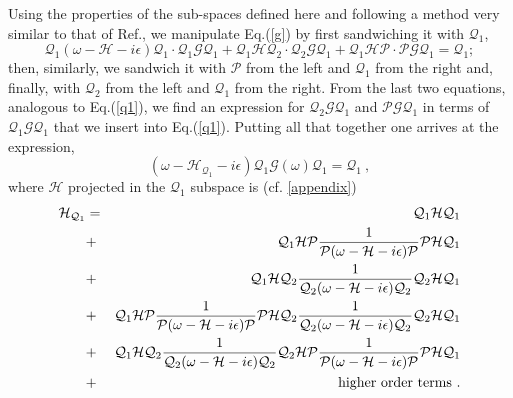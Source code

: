 \documentclass[12pt,a4paper,final]{iopart}
\begin{document}
Using the properties of the sub-spaces defined here and following a method very similar to that of Ref.\cite{yoshida1983}, we manipulate Eq.(\ref{g}) by first sandwiching it with $\mathcal{Q}_1$, 
\begin{equation}
\mathcal{Q}_1 (\omega-\mathcal{H}-i\epsilon)\mathcal{Q}_1\cdot\mathcal{Q}_1\mathcal{G}\mathcal{Q}_1 + \mathcal{Q}_1\mathcal{H}\mathcal{Q}_2\cdot\mathcal{Q}_2\mathcal{G}\mathcal{Q}_1+\mathcal{Q}_1\mathcal{H}\mathcal{P}\cdot\mathcal{P}\mathcal{G}\mathcal{Q}_1 = \mathcal{Q}_1 ;
\label{q1}
\end{equation}
then, similarly, we sandwich it with $\mathcal{P}$ from the left and $\mathcal{Q}_1$ from the right and, finally, with $\mathcal{Q}_2$ from the left and $\mathcal{Q}_1$ from the right. From the last two equations, analogous to Eq.(\ref{q1}), we find an expression for  $\mathcal{Q}_2\mathcal{G}\mathcal{Q}_1$ and $\mathcal{P}\mathcal{G}\mathcal{Q}_1$ in terms of $\mathcal{Q}_1\mathcal{G}\mathcal{Q}_1$ that we insert into Eq.(\ref{q1}). Putting all that together one arrives at the expression, 
\begin{equation}
(\omega-\mathcal{H}_{\mathcal{Q}_1}-i\epsilon)\mathcal{Q}_1\mathcal{G}(\omega)\mathcal{Q}_1 = \mathcal{Q}_1 \ ,
\end{equation}
where $\mathcal{H}$ projected in the $\mathcal{Q}_1$ subspace is (cf. \ref{appendix})
\begin{eqnarray}
\mathcal{H}_{\mathcal{Q}_1} &=& \mathcal{Q}_1\mathcal{H}\mathcal{Q}_1 \nonumber\\ 
%
&+&\mathcal{Q}_1\mathcal{H}\mathcal{P}\frac{1}{\mathcal{P}(\omega-\mathcal{H}-i\epsilon)\mathcal{P}}\mathcal{P}\mathcal{H}\mathcal{Q}_1 \nonumber\\
%
&+& \mathcal{Q}_1\mathcal{H}\mathcal{Q}_2\frac{1}{\mathcal{Q}_2(\omega-\mathcal{H}-i\epsilon)\mathcal{Q}_2}\mathcal{Q}_2\mathcal{H}\mathcal{Q}_1 
\nonumber\\  
%
&+&\mathcal{Q}_1\mathcal{H}\mathcal{P}\frac{1}{\mathcal{P}(\omega-\mathcal{H}-i\epsilon)\mathcal{P}}\mathcal{P}\mathcal{H}\mathcal{Q}_2\frac{1}{\mathcal{Q}_2(\omega-\mathcal{H}-i\epsilon)\mathcal{Q}_2}\mathcal{Q}_2\mathcal{H}\mathcal{Q}_1\nonumber\\
%
&+&\mathcal{Q}_1\mathcal{H}\mathcal{Q}_2\frac{1}{\mathcal{Q}_2(\omega-\mathcal{H}-i\epsilon)\mathcal{Q}_2}\mathcal{Q}_2\mathcal{H}\mathcal{P}\frac{1}{\mathcal{P}(\omega-\mathcal{H}-i\epsilon)\mathcal{P}}\mathcal{P}\mathcal{H}\mathcal{Q}_1 \nonumber\\
&+& {\rm higher~order~terms} \ .
\label{hq1.0}
\end{eqnarray}
\end{document}
